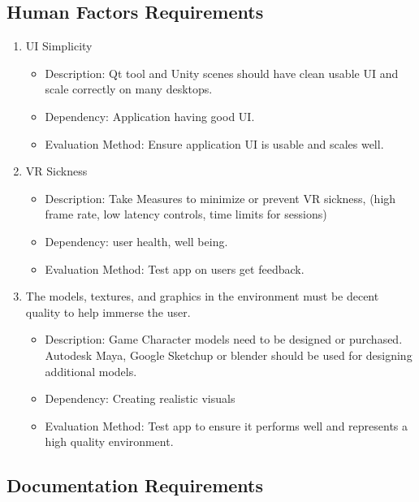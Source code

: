 \documentclass[a4paper,10pt]{article}
\begin{document}
	\subsection{Human Factors Requirements}
	\begin{enumerate}
	\item UI Simplicity
	    \begin{itemize}
	      \item Description: Qt tool and Unity scenes should have clean usable UI and scale correctly on many desktops.
	      \item Dependency:  Application having good UI.
	      \item Evaluation Method: Ensure application UI is usable and scales well.
	    \end{itemize}
	\item VR Sickness	 
	    \begin{itemize}
	      \item Description: Take Measures to minimize or prevent VR sickness, (high frame rate, low latency controls, time limits for sessions)
	      \item Dependency: user health, well being.
	      \item Evaluation Method: Test app on users get feedback.
	    \end{itemize}
	\item The models, textures, and graphics in the environment must be decent quality to help immerse the user.
	    \begin{itemize}
	      \item Description: Game Character models need to be designed or purchased. Autodesk Maya, Google Sketchup or blender should be used for designing additional models. 
	      \item Dependency: Creating realistic visuals 
	      \item Evaluation Method: Test app to ensure it performs well and represents a high quality environment.
	    \end{itemize}
	\end{enumerate}
	\subsection{Documentation Requirements}
\end{document}
